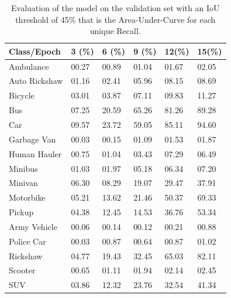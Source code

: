 \begin{table}[!h]
  \centering
  \caption[Evaluation of the Model]{Evaluation of the model on the validation set with an IoU threshold of 45\% that is the 
Area-Under-Curve for each unique Recall. }
  \label{tab:class-ap}
  {\renewcommand{\arraystretch}{1.1}
    \begin{tabular}{p{4.3cm} p{1cm} p{1cm} p{1cm} p{1cm} p{1cm}}
          \toprule
          Class/Epoch                       & 3 (\%) & 6 (\%) & 9 (\%) & 12(\%)  & 15(\%) \\
          \hline
          Ambulance                   & 00.27    &  00.89 & 01.04  & 01.67   & 02.05  \\
          Auto Rickshaw               & 01.16    &  02.41 & 05.96  & 08.15   & 08.69  \\
          Bicycle                     & 03.01    &  03.87 & 07.11  & 09.83   & 11.27  \\
          Bus                         & 07.25    &  20.59 & 65.26  & 81.26   & 89.28  \\
          Car                         & 09.57    &  23.72 & 59.05  & 85.11   & 94.60  \\
          Garbage Van                 & 00.03    &  00.15 & 01.09  & 01.53   & 01.87  \\
          Human Hauler                & 00.75    &  01.04 & 03.43  & 07.29   & 06.49  \\
          Minibus                     & 01.03    &  01.97 & 05.18  & 06.34   & 07.20  \\
          Minivan                     & 06.30    &  08.29 & 19.07  & 29.47   & 37.91  \\
          Motorbike                   & 05.21    &  13.62 & 21.46  & 50.37   & 69.33  \\
          Pickup                      & 04.38    &  12.45 & 14.53  & 36.76   & 53.34  \\
          Army Vehicle                & 00.06    &  00.14 & 00.12  & 00.21   & 00.88  \\
          Police Car                  & 00.03    &  00.87 & 00.64  & 00.87   & 01.02  \\
          Rickshaw                    & 04.77    &  19.43 & 32.45  & 65.03   & 82.11  \\
          Scooter                     & 00.65    &  01.11 & 01.94  & 02.14   & 02.45  \\
          SUV                         & 03.86    &  12.32 & 23.76  & 32.54   & 41.34  \\

\end{tabular}}
\end{table}
